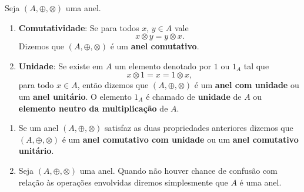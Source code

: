 \documentclass{beamer}
\begin{document}
    \begin{frame}
        \begin{observacoes}
            Seja $(A, \oplus, \otimes)$ uma anel.
            \begin{enumerate}[label={\arabic*})]
                \item \textbf{Comutatividade}: Se para todos $x$, $y \in A$ vale
                \[
                    x \otimes y = y \otimes x.
                \]
                Dizemos que $(A, \oplus, \otimes)$ {\'e} um \textbf{anel comutativo}.

                \vspace{.7cm}

                \item \textbf{Unidade}: Se existe em $A$ um elemento denotado por $1$ ou $1_{A}$ tal que
                \[
                    x \otimes 1 = x = 1 \otimes x,
                \]
                para todo $x \in A$, ent{\~a}o dizemos que $(A, \oplus, \otimes)$ \'e um \textbf{anel com unidade} ou um \textbf{anel unit{\'a}rio}. O elemento $1_A$ {\'e} chamado de \textbf{unidade} de $A$ ou \textbf{elemento neutro da multiplica\c{c}\~ao} de $A$.

                \vspace{.7cm}

                \seti
             \end{enumerate}
        \end{observacoes}
    \end{frame}

    \begin{frame}
        \begin{observacoes}
            \begin{enumerate}[label={\arabic*})]
                \conti

                \item Se um anel $(A, \oplus, \otimes)$ satisfaz as duas propriedades anteriores dizemos que $(A, \oplus, \otimes)$ \'e um \textbf{anel comutativo com unidade} ou um \textbf{anel comutativo unit\'ario}.

                \vspace{.5cm}

                \item Seja $(A, \oplus, \otimes)$ uma anel. Quando n\~ao houver chance de confus\~ao com rela\c{c}\~ao \`as opera\c{c}\~oes envolvidas diremos simplesmente que $A$ \'e uma anel.
            \end{enumerate}
        \end{observacoes}
    \end{frame}
\end{document}
